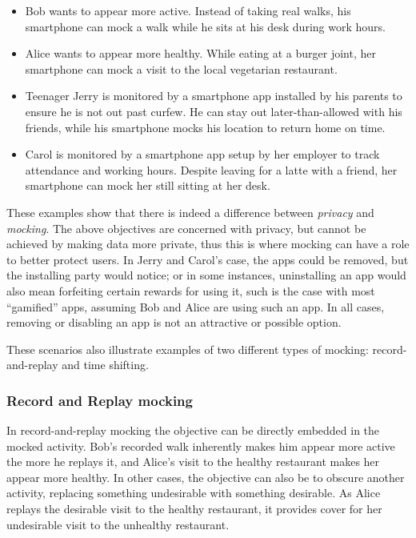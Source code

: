 \begin{itemize}

\item Bob wants to appear more active. Instead of taking real walks, his
smartphone can mock a walk while he sits at his desk during work hours.

\item Alice wants to appear more healthy. While eating at a burger joint, her
smartphone can mock a visit to the local vegetarian restaurant.

\item Teenager Jerry is monitored by a smartphone app installed by his parents
to ensure he is not out past curfew. He can stay out later-than-allowed with
his friends, while his smartphone mocks his location to return home on time.

\item Carol is monitored by a smartphone app setup by her employer to track
attendance and working hours. Despite leaving for a latte with a friend, her
smartphone can mock her still sitting at her desk.

\end{itemize}

These examples show that there is indeed a difference between \textit{privacy}
and \textit{mocking}. The above objectives are concerned with privacy, but
cannot be achieved by making data more private, thus this is where mocking can
have a role to better protect users. In Jerry and Carol's case, the apps could
be removed, but the installing party would notice; or in some instances,
uninstalling an app would also mean forfeiting certain rewards for using it,
such is the case with most ``gamified'' apps, assuming Bob and Alice are using
such an app. In all cases, removing or disabling an app is not an attractive or
possible option.

These scenarios also illustrate examples of two different types of
mocking: record-and-replay and time shifting.

\subsubsection{Record and Replay mocking}

In record-and-replay mocking the objective can be directly embedded in the
mocked activity. Bob's recorded walk inherently makes him appear more active
the more he replays it, and Alice's visit to the healthy restaurant makes her
appear more healthy. In other cases, the objective can also be to obscure
another activity, replacing something undesirable with something desirable.
As Alice replays the desirable visit to the healthy restaurant, it provides
cover for her undesirable visit to the unhealthy restaurant.

